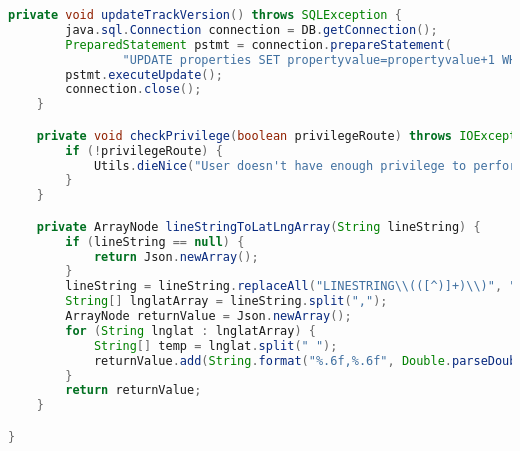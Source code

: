 \begin{lstlisting}[language=Java,basicstyle=\tiny,caption=models/TracksManager.java,label={lst:tracksmanager.java}]
	private void updateTrackVersion() throws SQLException {
		java.sql.Connection connection = DB.getConnection();
		PreparedStatement pstmt = connection.prepareStatement(
				"UPDATE properties SET propertyvalue=propertyvalue+1 WHERE propertyname='trackversion'");
		pstmt.executeUpdate();
		connection.close();
	}

	private void checkPrivilege(boolean privilegeRoute) throws IOException {
		if (!privilegeRoute) {
			Utils.dieNice("User doesn't have enough privilege to perform the action.");
		}
	}

	private ArrayNode lineStringToLatLngArray(String lineString) {
		if (lineString == null) {
			return Json.newArray();
		}
		lineString = lineString.replaceAll("LINESTRING\\(([^)]+)\\)", "$1");
		String[] lnglatArray = lineString.split(",");
		ArrayNode returnValue = Json.newArray();
		for (String lnglat : lnglatArray) {
			String[] temp = lnglat.split(" ");
			returnValue.add(String.format("%.6f,%.6f", Double.parseDouble(temp[1]), Double.parseDouble(temp[0])));
		}
		return returnValue;
	}

}
\end{lstlisting}

